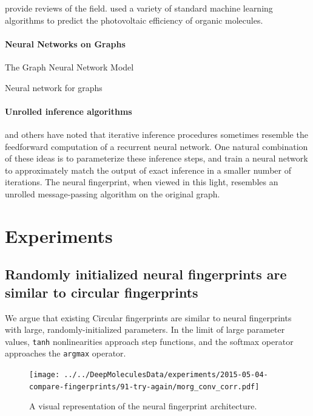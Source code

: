 \documentclass{article}
\begin{document}
\cite{Eckert2007225, bergeron2011modeling} provide reviews of the field.
\cite{tingley2014towards} used a variety of standard machine learning algorithms to predict the photovoltaic efficiency of organic molecules.

\paragraph{Neural Networks on Graphs}

\cite{graphnn2009} The Graph Neural Network Model

\cite{micheli2009neural} Neural network for graphs

\paragraph{Unrolled inference algorithms}
\citet{hershey2014deep} and others have noted that iterative inference procedures sometimes resemble the feedforward computation of a recurrent neural network.
One natural combination of these ideas is to parameterize these inference steps, and train a neural network to approximately match the output of exact inference in a smaller number of iterations.
The neural fingerprint, when viewed in this light, resembles an unrolled message-passing algorithm on the original graph.


\section{Experiments}


\subsection{Randomly initialized neural fingerprints are similar to circular fingerprints}
\label{sec:random is equivalent}

We argue that existing Circular fingerprints are similar to neural fingerprints with large, randomly-initialized parameters.
In the limit of large parameter values, \texttt{tanh} nonlinearities approach step functions, and the softmax operator approaches the \texttt{argmax} operator.

\begin{figure}[h]
\centerline{\texttt{[image: ../../DeepMoleculesData/experiments/2015-05-04-compare-fingerprints/91-try-again/morg\_conv\_corr.pdf]}}
\caption{A visual representation of the neural fingerprint architecture.
}
\label{fig:fingerprint similarity}
\end{figure}
\end{document}
